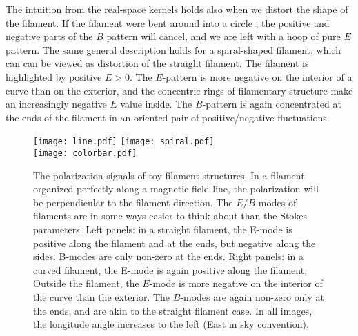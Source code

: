 The intuition from the real-space kernels holds also when we distort the shape of the filament.  If the filament were bent around into a circle , the positive and negative parts of the $B$ pattern will cancel, and we are left with a hoop of pure $E$ pattern.  The same general description holds for a spiral-shaped filament, which can can be viewed as distortion of the straight filament.  The filament is highlighted by positive $E>0$.  The $E$-pattern is more negative on the interior of a curve than on the exterior, and the concentric rings of filamentary structure make an increasingly negative $E$ value inside.  The $B$-pattern is again concentrated at the ends of the filament in an oriented pair of positive/negative fluctuations.
 
 
\begin{figure}
  \texttt{[image: line.pdf]}
  \texttt{[image: spiral.pdf]} \\
   \texttt{[image: colorbar.pdf]}
\caption{
    The polarization signals of toy filament structures.
    In a filament organized perfectly along a magnetic field line, the polarization will be perpendicular to the filament direction.  The $E/B$ modes of filaments are in some ways easier to think about than the Stokes parameters.
    Left panels: in a straight filament, the E-mode is positive along the filament and at the ends, but negative along the sides.  B-modes are only non-zero at the ends.  Right panels: in a curved filament, the E-mode is again positive along the filament.  Outside the filament, the $E$-mode is more negative on the interior of the curve than the exterior.  The $B$-modes are again non-zero only at the ends, and are akin to the straight filament case.
    In all images, the longitude angle increases to the left (East in sky convention).}
  \label{fig:polfilaments}
\end{figure}




 

